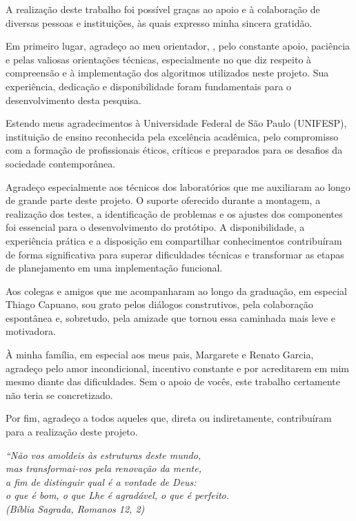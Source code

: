 \documentclass[	12pt, Times, openright, twoside, a4paper, english, brazil]{abntex2}
\begin{document}
\begin{agradecimentos}

A realização deste trabalho foi possível graças ao apoio e à colaboração de diversas pessoas e instituições, às quais expresso minha sincera gratidão.

Em primeiro lugar, agradeço ao meu orientador, \imprimirorientador, pelo constante apoio, paciência e pelas valiosas orientações técnicas, especialmente no que diz respeito à compreensão e à implementação dos algoritmos utilizados neste projeto. Sua experiência, dedicação e disponibilidade foram fundamentais para o desenvolvimento desta pesquisa.

Estendo meus agradecimentos à Universidade Federal de São Paulo (UNIFESP), instituição de ensino reconhecida pela excelência acadêmica, pelo compromisso com a formação de profissionais éticos, críticos e preparados para os desafios da sociedade contemporânea.

Agradeço especialmente aos técnicos dos laboratórios que me auxiliaram ao longo de grande parte deste projeto. O suporte oferecido durante a montagem, a realização dos testes, a identificação de problemas e os ajustes dos componentes foi essencial para o desenvolvimento do protótipo. A disponibilidade, a experiência prática e a disposição em compartilhar conhecimentos contribuíram de forma significativa para superar dificuldades técnicas e transformar as etapas de planejamento em uma implementação funcional.

Aos colegas e amigos que me acompanharam ao longo da graduação, em especial Thiago Capuano, sou grato pelos diálogos construtivos, pela colaboração espontânea e, sobretudo, pela amizade que tornou essa caminhada mais leve e motivadora.

À minha família, em especial aos meus pais, Margarete e Renato Garcia, agradeço pelo amor incondicional, incentivo constante e por acreditarem em mim mesmo diante das dificuldades. Sem o apoio de vocês, este trabalho certamente não teria se concretizado.

Por fim, agradeço a todos aqueles que, direta ou indiretamente, contribuíram para a realização deste projeto.

\end{agradecimentos}

\begin{epigrafe}
	\vspace*{\fill}
	\begin{flushright}
		\textit{``Não vos amoldeis às estruturas deste mundo, \\
		mas transformai-vos pela renovação da mente, \\
		a fim de distinguir qual é a vontade de Deus: \\
		o que é bom, o que Lhe é agradável, o que é perfeito.\\
		(Bíblia Sagrada, Romanos 12, 2)}
	\end{flushright}
\end{epigrafe}
\end{document}
